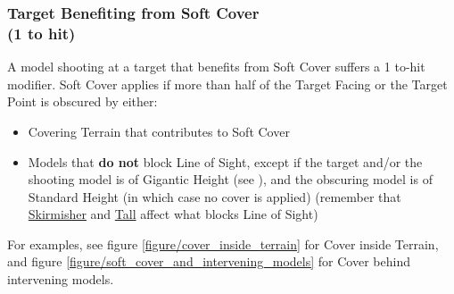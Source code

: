 \subsubsection[Target Benefiting from Soft Cover (\minuss{}1 to hit)]{Target Benefiting from Soft Cover\\ (\minuss{}1 to hit)}

\newcommand{\figCITA}{a)}
\newcommand{\figCITB}{b)}


A model shooting at a target that benefits from Soft Cover suffers a \minuss{}1 to-hit modifier. Soft Cover applies if more than half of the Target Facing or the Target Point is obscured by either:
\begin{itemize}
	\item Covering Terrain that contributes to Soft Cover
	\item Models that \textbf{do not} block Line of Sight, except if the target and/or the shooting model is of Gigantic Height (see ), and the obscuring model is of Standard Height (in which case no cover is applied) (remember that \hyperref[skirmisher]{Skirmisher} and \hyperref[tall]{Tall} affect what blocks Line of Sight)
\end{itemize}

For examples, see figure \ref{figure/cover_inside_terrain} for Cover inside Terrain, and figure \ref{figure/soft_cover_and_intervening_models} for Cover behind intervening models.

